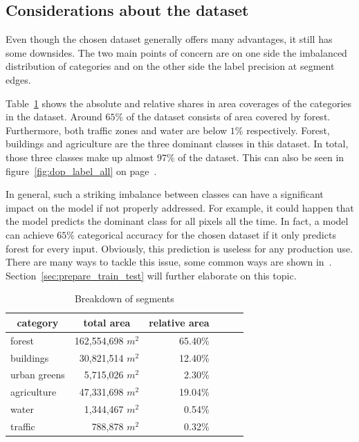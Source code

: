 \subsection{Considerations about the dataset}
\label{sec:dataset_considerations}

Even though the chosen dataset generally offers many advantages, it still has some downsides. The two main points of concern are on one side the imbalanced distribution of categories and on the other side the label precision at segment edges.

Table~\ref{tab:seg-breakdown} shows the absolute and relative shares in area coverages of the categories in the dataset. Around $65\%$ of the dataset consists of area covered by forest. Furthermore, both traffic zones and water are below $1\%$ respectively. Forest, buildings and agriculture are the three dominant classes in this dataset. In total, those three classes make up almost $97\%$ of the dataset. This can also be seen in figure~\ref{fig:dop_label_all} on page~\pageref{fig:dop_label_all}.

In general, such a striking imbalance between classes can have a significant impact on the model if not properly addressed. For example, it could happen that the model predicts the dominant class for all pixels all the time. In fact, a model can achieve $65\%$ categorical accuracy for the chosen dataset if it only predicts forest for every input. Obviously, this prediction is useless for any production use. There are many ways to tackle this issue, some common ways are shown in~\cite{imbalanced_data09}. Section~\ref{sec:prepare_train_test} will further elaborate on this topic.

\begin{table}
\centering
\begin{tabular}{|l|r|r|r|r|r|}
\hline
\multicolumn{1}{|c|}{\textbf{category}} &
  \multicolumn{1}{c|}{\textbf{total area}} &
  \multicolumn{1}{c|}{\textbf{relative area}} \\ \hline
forest       & 162,554,698 $m^2$ & 65.40\%  \\ \hline
buildings    & 30,821,514  $m^2$ & 12.40\%  \\ \hline
urban greens & 5,715,026   $m^2$ & 2.30\%   \\ \hline
agriculture  & 47,331,698  $m^2$ & 19.04\%  \\ \hline
water        & 1,344,467   $m^2$ & 0.54\%   \\ \hline
traffic      & 788,878     $m^2$ & 0.32\%   \\ \hline
\end{tabular}
\caption{Breakdown of segments}
\label{tab:seg-breakdown}
\end{table}

